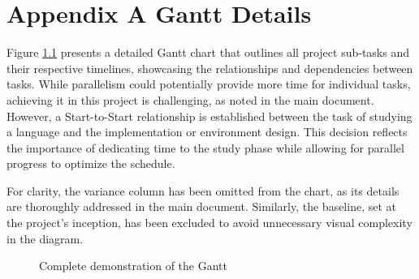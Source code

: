 
\chapter{Appendix A Gantt Details} %

\label{AppendixA} %

Figure \ref{fig:gantt_complete} presents a detailed Gantt chart that outlines all project sub-tasks and their respective timelines, showcasing the relationships and dependencies between tasks. While parallelism could potentially provide more time for individual tasks, achieving it in this project is challenging, as noted in the main document. However, a Start-to-Start relationship is established between the task of studying a language and the implementation or environment design. This decision reflects the importance of dedicating time to the study phase while allowing for parallel progress to optimize the schedule.

For clarity, the variance column has been omitted from the chart, as its details are thoroughly addressed in the main document. Similarly, the baseline, set at the project’s inception, has been excluded to avoid unnecessary visual complexity in the diagram.

\begin{figure}
    \centering
    \caption{Complete demonstration of the Gantt}
    \label{fig:gantt_complete}
\end{figure}